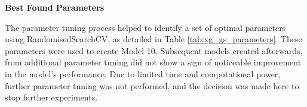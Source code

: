 \textbf{Best Found Parameters}
\medskip

The parameter tuning process helped to identify a set of optimal parameters using RandomisedSearchCV, as detailed in Table \ref{tab:xg_gs_parameters}. These parameters were used to create Model 10. Subsequent models created afterwards, from additional parameter tuning did not show a sign of noticeable improvement in the model's performance. Due to limited time and computational power, further parameter tuning was not performed, and the decision was made here to stop further experiments.
